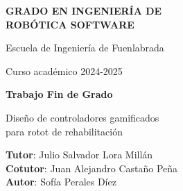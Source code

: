 \thispagestyle{empty}
\vspace{2cm}

\begin{figure}[htb]
  \centerline{}
\end{figure}

\begin{center}
  {\Large {\bf GRADO EN INGENIERÍA DE\\ 
                ROBÓTICA SOFTWARE}}
  \vspace{5mm}
 
  {\large {Escuela de Ingeniería de Fuenlabrada}}
  \vspace{5mm}

  {\large {Curso académico 2024-2025}}

  \vspace{1cm}

  {\large {\bf Trabajo Fin de Grado}}

  \vspace{2cm}

  {\Large {Diseño de controladores gamificados\\
              para rotot de rehabilitación\\[1cm] }}

  \vspace{4cm}
  {\bf Tutor}: Julio Salvador Lora Millán \\
  {\bf Cotutor}: Juan Alejandro Castaño Peña \\
  {\bf Autor}: Sofía Perales Díez
\end{center}

\clearpage
\thispagestyle{empty}
